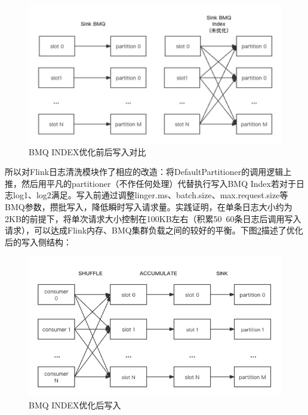  \begin{figure}[htb]
  \centering
  \includegraphics[width=5in]{figure/chapter4/BMQ INDEX优化前后写入对比.jpg}
  \caption{BMQ INDEX优化前后写入对比}\label{bmqindexyouhua}
\end{figure}

所以对Flink日志清洗模块作了相应的改造：将DefaultPartitioner的调用逻辑上推，然后用平凡的partitioner（不作任何处理）代替执行写入BMQ Index若对于日志log1、log2满足。写入前通过调整linger.ms、batch.size\cite{wu2019performance}、max.request.size等BMQ参数，攒批写入，降低瞬时写入请求量。实践证明，在单条日志大小约为2KB的前提下，将单次请求大小控制在100KB左右（积累50~60条日志后调用写入请求），可以达成Flink内存、BMQ集群负载之间的较好的平衡。下图\ref{bmqindexyouhuahou}描述了优化后的写入侧结构：

  \begin{figure}[htb]
  \centering
  \includegraphics[width=5in]{figure/chapter4/BMQ INDEX优化后写入.jpg}
  \caption{BMQ INDEX优化后写入}\label{bmqindexyouhuahou}
\end{figure}

